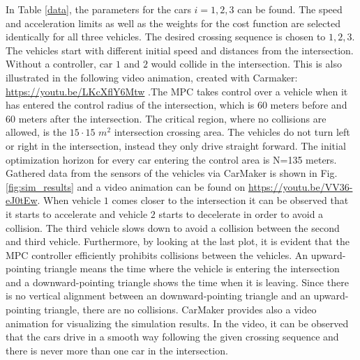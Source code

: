 \documentclass[letterpaper,10pt,conference]{ieeeconf}
\begin{document}
In Table \ref{data}, the parameters for the cars $i=1,2,3$ can be found. The speed and acceleration limits as well as the weights for the cost function are selected identically for all three vehicles. The desired crossing sequence is chosen to $1,2,3$. The vehicles start with different initial speed and distances from the intersection. Without a controller, car $1$ and $2$ would collide in the intersection. This is also illustrated in the following video animation, created with Carmaker: \url{https://youtu.be/LKcXflY6Mtw} .The MPC takes control over a vehicle when it has entered the control radius of the intersection, which is $60$ meters before and $60$ meters after the intersection. The critical region, where no collisions are allowed, is the $15\cdot15$ $m^2$ intersection crossing area. The vehicles do not turn left or right in the intersection, instead they only drive straight forward. The initial optimization horizon for every car entering the control area is N=135 meters. \\ \indent
Gathered data from the sensors of the vehicles via CarMaker is shown in Fig. \ref{fig:sim_results} and a video animation can be found on \url{https://youtu.be/VV36-eJ0tEw}. When vehicle $1$ comes closer to the intersection it can be observed that it starts to accelerate and vehicle $2$ starts to decelerate in order to avoid a collision. The third vehicle slows down to avoid a collision between the second and third vehicle. 
Furthermore, by looking at the last plot, it is evident that the MPC controller efficiently prohibits collisions  between the vehicles. An upward-pointing triangle means the time where the vehicle is entering the intersection and a downward-pointing triangle shows the time when it is leaving. Since there is no vertical alignment between an downward-pointing triangle and an upward-pointing triangle, there are no collisions. CarMaker provides also a video animation for visualizing the simulation results. In the video, it can be observed that the cars drive in a smooth way following the given crossing sequence and there is never more than one car in the intersection.
\end{document}
